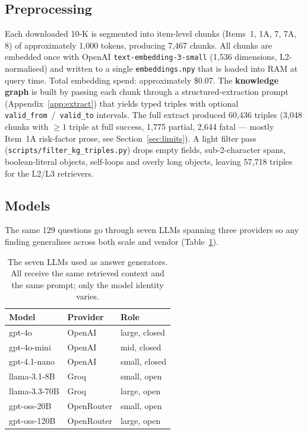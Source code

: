 \documentclass[11pt]{article}
\begin{document}
\subsection{Preprocessing}
\label{sec:preproc}
Each downloaded 10-K is segmented into item-level chunks (Items~1,
1A, 7, 7A, 8) of approximately 1{,}000 tokens, producing 7{,}467
chunks. All chunks are embedded once with OpenAI
\texttt{text-embedding-3-small} (1{,}536 dimensions, L2-normalised) and
written to a single \texttt{embeddings.npy} that is loaded into RAM at
query time. Total embedding spend: approximately \$0.07. The
\textbf{knowledge graph} is built by passing each chunk through a
structured-extraction prompt (Appendix~\ref{app:extract}) that yields
typed triples with optional \texttt{valid\_from}~/~\texttt{valid\_to}
intervals. The full extract produced 60{,}436 triples (3{,}048 chunks
with $\geq 1$ triple at full success, 1{,}775 partial, 2{,}644 fatal
--- mostly Item~1A risk-factor prose, see Section~\ref{sec:limits}).
A light filter pass (\texttt{scripts/filter\_kg\_triples.py}) drops
empty fields, sub-2-character spans, boolean-literal objects, self-loops
and overly long objects, leaving 57{,}718 triples for the L2/L3
retrievers.

\subsection{Models}
\label{sec:models}
The same 129 questions go through seven LLMs spanning three providers
so any finding generalises across both scale and vendor
(Table~\ref{tab:models}).

\begin{table}[h]
\centering
\small
\begin{tabular}{lll}
\toprule
Model & Provider & Role \\
\midrule
gpt-4o              & OpenAI     & large, closed \\
gpt-4o-mini         & OpenAI     & mid, closed   \\
gpt-4.1-nano        & OpenAI     & small, closed \\
llama-3.1-8B        & Groq       & small, open   \\
llama-3.3-70B       & Groq       & large, open   \\
gpt-oss-20B         & OpenRouter & small, open   \\
gpt-oss-120B        & OpenRouter & large, open   \\
\bottomrule
\end{tabular}
\caption{The seven LLMs used as answer generators. All receive the
same retrieved context and the same prompt; only the model identity
varies.}
\label{tab:models}
\end{table}
\end{document}
